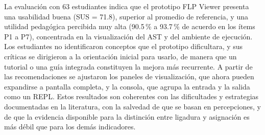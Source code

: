 La evaluación con 63 estudiantes indica que el prototipo FLP Viewer presenta una usabilidad buena (SUS = 71.8), superior al promedio de referencia, y una utilidad pedagógica percibida muy alta (90.5\,\% a 93.7\,\% de acuerdo en los ítems P1 a P7), concentrada en la visualización del AST y del ambiente de ejecución. Los estudiantes no identificaron conceptos que el prototipo dificultara, y sus críticas se dirigieron a la orientación inicial para usarlo, de manera que un tutorial o una guía integrada constituyen la mejora más recurrente. A partir de las recomendaciones se ajustaron los paneles de visualización, que ahora pueden expandirse a pantalla completa, y la consola, que agrupa la entrada y la salida como un REPL. Estos resultados son coherentes con las dificultades y estrategias documentadas en la literatura, con la salvedad de que se basan en percepciones, y de que la evidencia disponible para la distinción entre ligadura y asignación es más débil que para los demás indicadores.

